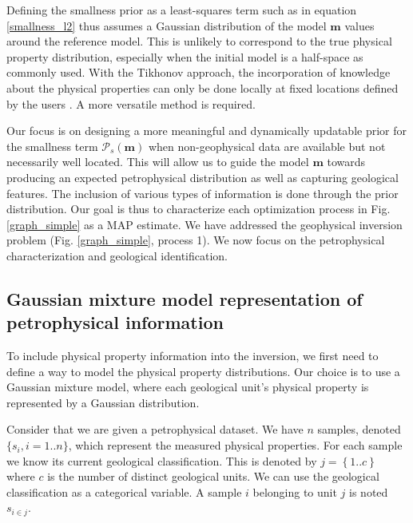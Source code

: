 \documentclass[extra]{gji} %
\begin{document}
Defining the smallness prior as a least-squares term such as in equation \ref{smallness_l2} thus assumes a Gaussian distribution of the model $\mathbf{m}$ values around the reference model. This is unlikely to correspond to the true physical property distribution, especially when the initial model is a half-space as commonly used. With the Tikhonov approach, the incorporation of knowledge about the physical properties can only be done locally at fixed locations defined by the users \citep{Lelievre2009}. A more versatile method is required.

Our focus is on designing a more meaningful and dynamically updatable prior for the smallness term $\mathcal{P}_{s}(\mathbf{m})$ when non-geophysical data are available but not necessarily well located. This will allow us to guide the model $\mathbf{m}$ towards producing an expected petrophysical distribution as well as capturing geological features. The inclusion of various types of information is done through the prior distribution. Our goal is thus to characterize each optimization process in Fig. \ref{graph_simple} as a MAP estimate. We have addressed the geophysical inversion problem (Fig. \ref{graph_simple}, process 1). We now focus on the petrophysical characterization and geological identification.


\subsection{Gaussian mixture model representation of petrophysical information} \label{PetrophysicsSection}

To include physical property information into the inversion, we first need to define a way to model the physical property distributions. Our choice is to use a Gaussian mixture model, where each geological unit's physical property is represented by a Gaussian distribution.

Consider that we are given a petrophysical dataset. We have $n$ samples, denoted $\{s_i,i=1..n\}$, which represent the measured physical properties. For each sample we know its current geological classification. This is denoted by $j=\left\{1..c\right\}$ where $c$ is the number of distinct geological units. We can use the geological classification as a categorical variable. A sample $i$ belonging to unit $j$ is noted $s_{i\in j}$.
\end{document}
